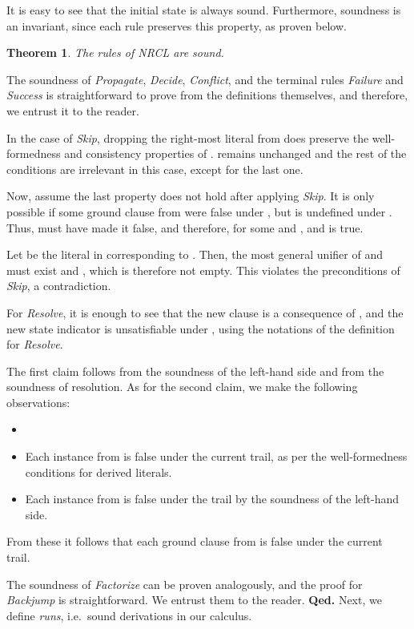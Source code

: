 \documentclass[a4paper]{article}
\newcommand{\startproof}{{\bf Proof:~}}
\newcommand{\finishproof}{{\bf Qed.}}
\newtheorem{theo}[defi]{Theorem}
\begin{document}
{It is easy to see that the initial state  is always sound.
Furthermore, soundness is an invariant, since each rule preserves this property, as proven below.

\begin{theo}\label{sndrulesTheo}
The rules of NRCL are sound.
\end{theo}
\noindent\startproof
The soundness of \emph{Propagate}, \emph{Decide}, \emph{Conflict}, and 
the terminal rules \emph{Failure} and \emph{Success} is straightforward 
to prove from the definitions themselves, and therefore, we entrust it to the reader.

In the case of \emph{Skip}, dropping the right-most literal  from  does preserve 
the well-formedness and consistency properties of . 
 remains unchanged and the rest 
of the conditions are irrelevant in this case, except for the last one.

Now, assume the last property does not hold after applying \emph{Skip}. It is only possible if some 
ground clause  from  were false under , but is undefined
under . Thus,  must have made it false, and therefore, for some  and , 
 and  is true. 

Let  be the literal in  corresponding to . Then, the most general unifier  of  and  
must exist and , which is therefore not empty. This violates the 
preconditions of \emph{Skip}, a contradiction.

For \emph{Resolve}, it is enough to see that the new clause is a consequence of , and the new 
state indicator  is unsatisfiable under , using the notations of 
the definition for \emph{Resolve}.

The first claim follows from the soundness of the left-hand side and from the soundness of resolution.
As for the second claim, we make the following observations:
\begin{itemize}
  \item 
	\item Each instance from  is false under the current trail, as per the well-formedness conditions for derived literals.
	\item Each instance from  is false under the trail by the soundness of the left-hand side.
\end{itemize}
From these it follows that each ground clause from  is false under the current trail.

The soundness of \emph{Factorize} can be proven analogously, and the proof for \emph{Backjump} is straightforward. 
We entrust them to the reader.
\finishproof\leaveabit
\noindent
Next, we define \emph{runs}, i.e.\ sound derivations in our calculus.

}
\end{document}
